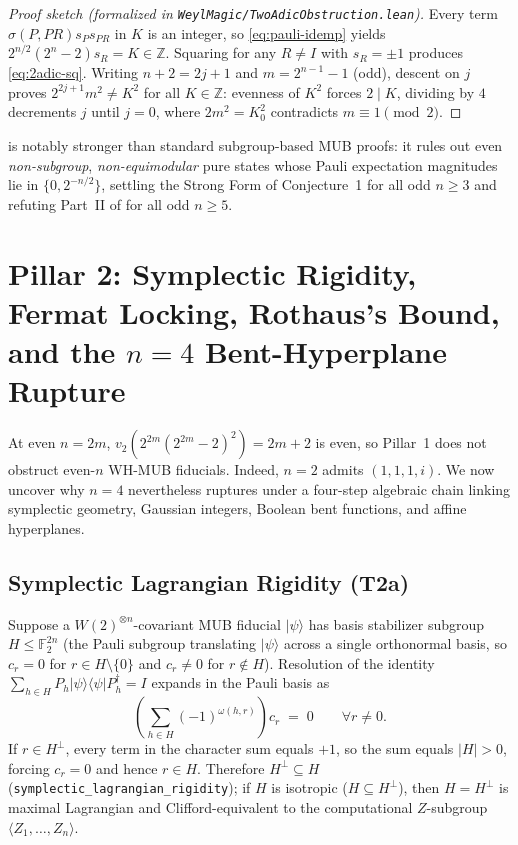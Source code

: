 \documentclass[11pt,reqno]{amsart}
\theoremstyle{definition}
\newcommand{\F}{\mathbb{F}}
\newcommand{\Z}{\mathbb{Z}}
\begin{document}
\begin{proof}[Proof sketch (formalized in \texttt{WeylMagic/TwoAdicObstruction.lean})]
Every term $\sigma(P,PR)s_P s_{PR}$ in $K$ is an integer, so \eqref{eq:pauli-idemp}
yields $2^{n/2}(2^n-2)s_R=K\in\Z$. Squaring for any $R\neq I$ with $s_R=\pm 1$ produces
\eqref{eq:2adic-sq}. Writing $n+2=2j+1$ and $m=2^{n-1}-1$ (odd), descent on $j$ proves
$2^{2j+1}m^2\neq K^2$ for all $K\in\Z$: evenness of $K^2$ forces $2\mid K$, dividing
by $4$ decrements $j$ until $j=0$, where $2m^2=K_0^2$ contradicts $m\equiv 1\pmod 2$.
\end{proof}

 is notably stronger than standard subgroup-based MUB proofs: it rules out
even \emph{non-subgroup}, \emph{non-equimodular} pure states whose Pauli expectation
magnitudes lie in $\{0,2^{-n/2}\}$, settling the Strong Form of \cite{Damski2026ProductWH}
Conjecture~1 for all odd $n\ge 3$ and refuting Part~II of \cite{Liu2026MaximalMagic} for
all odd $n\ge 5$.

\section{Pillar 2: Symplectic Rigidity, Fermat Locking, Rothaus's Bound, and the \texorpdfstring{$n=4$}{n=4} Bent-Hyperplane Rupture}\label{sec:pillar2}

At even $n=2m$, $v_2(2^{2m}(2^{2m}-2)^2)=2m+2$ is even, so Pillar~1 does not obstruct
even-$n$ WH-MUB fiducials. Indeed, $n=2$ admits $(1,1,1,i)$. We now uncover why $n=4$
nevertheless ruptures under a four-step algebraic chain linking symplectic geometry,
Gaussian integers, Boolean bent functions, and affine hyperplanes.

\subsection{Symplectic Lagrangian Rigidity (T2a)}
Suppose a $W(2)^{\otimes n}$-covariant MUB fiducial $|\psi\rangle$ has basis stabilizer
subgroup $H\le\F_2^{2n}$ (the Pauli subgroup translating $|\psi\rangle$ across a single
orthonormal basis, so $c_r=0$ for $r\in H\setminus\{0\}$ and $c_r\neq 0$ for $r\notin H$).
Resolution of the identity $\sum_{h\in H} P_h|\psi\rangle\langle\psi|P_h^\dagger = I$
expands in the Pauli basis as
\begin{equation}\label{eq:char-sum}
  \left(\sum_{h\in H} (-1)^{\omega(h,r)}\right) c_r \;=\; 0
  \qquad \forall r\neq 0.
\end{equation}
If $r\in H^\perp$, every term in the character sum equals $+1$, so the sum equals $|H|>0$,
forcing $c_r=0$ and hence $r\in H$. Therefore $H^\perp\subseteq H$ (\texttt{symplectic\_lagrangian\_rigidity});
if $H$ is isotropic ($H\subseteq H^\perp$), then $H=H^\perp$ is maximal Lagrangian and
Clifford-equivalent to the computational $Z$-subgroup $\langle Z_1,\dots,Z_n\rangle$.
\end{document}
